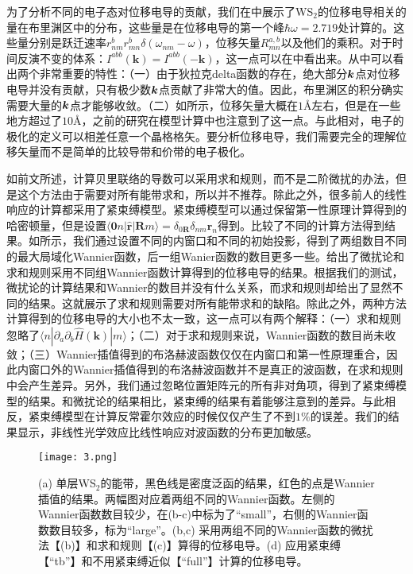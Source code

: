 为了分析不同的电子态对位移电导的贡献，我们在中展示了WS$_2$的位移电导相关的量在布里渊区中的分布，这些量是在位移电导的第一个峰$\hbar\omega = 2.719$处计算的。这些量分别是跃迁速率$r_{nm}^{b}r_{mn}^{b}\delta(\omega_{nm}-\omega)$，位移矢量$R_{mn}^{a,b}$以及他们的乘积。对于时间反演不变的体系：$I^{abb}(\mathbf{k})=I^{abb}(-\mathbf{k})$，这一点可以在中看出来。从中可以看出两个非常重要的特性：（一）由于狄拉克delta函数的存在，绝大部分$\boldsymbol{k}$点对位移电导并没有贡献，只有极少数$\boldsymbol{k}$点贡献了非常大的值。因此，布里渊区的积分确实需要大量的$\boldsymbol{k}$点才能够收敛。（二）如所示，位移矢量大概在$1$\AA 左右，但是在一些地方超过了$10$\AA ，之前的研究\cite{fregoso_quantitative_2016}在模型计算中也注意到了这一点。与此相对，电子的极化的定义可以相差任意一个晶格格矢。要分析位移电导，我们需要完全的理解位移矢量而不是简单的比较导带和价带的电子极化\cite{young2012}。


如前文所述，计算贝里联络的导数可以采用求和规则，而不是二阶微扰的办法，但是这个方法由于需要对所有能带求和，所以并不推荐。除此之外，很多前人的线性响应的计算都采用了紧束缚模型。紧束缚模型可以通过保留第一性原理计算得到的哈密顿量，但是设置$\langle\mathbf{0}n|\hat{\mathbf{r}}|\mathbf{R}m\rangle=\delta_{0\mathbf{R}}\delta_{nm}\mathbf{r}_{n}$得到。比较了不同的计算方法得到结果。如所示，我们通过设置不同的内窗口和不同的初始投影，得到了两组数目不同的最大局域化Wannier函数，后一组Wanier函数的数目更多一些。给出了微扰论和求和规则采用不同组Wannier函数计算得到的位移电导的结果。根据我们的测试，微扰论的计算结果和Wannier的数目并没有什么关系，而求和规则却给出了显然不同的结果。这就展示了求和规则需要对所有能带求和的缺陷。除此之外，两种方法计算得到的位移电导的大小也不太一致，这一点可以有两个解释：（一）求和规则忽略了$\langle n|\partial_{a}\partial_{b}\hat{H}(\mathbf{k})|m\rangle$；（二）对于求和规则来说，Wannier函数的数目尚未收敛；（三）Wannier插值得到的布洛赫波函数仅仅在内窗口和第一性原理重合，因此内窗口外的Wannier插值得到的布洛赫波函数并不是真正的波函数，在求和规则中会产生差异。另外，我们通过忽略位置矩阵元的所有非对角项，得到了紧束缚模型的结果。和微扰论的结果相比，紧束缚的结果有着能够注意到的差异。与此相反，紧束缚模型在计算反常霍尔效应的时候仅仅产生了不到$1\%$的误差\cite{wang_textitab_2006}。我们的结果显示，非线性光学效应比线性响应对波函数的分布更加敏感。

\begin{figure}
	\begin{centering}
	\texttt{[image: 3.png]}
	\par\end{centering}
	\caption{\label{fig3} (a) 单层WS$_2$的能带，黑色线是密度泛函的结果，红色的点是Wannier插值的结果。两幅图对应着两组不同的Wannier函数。左侧的Wannier函数数目较少，在(b-c)中标为了“small”，右侧的Wannier函数数目较多，标为“large”。(b,c) 采用两组不同的Wannier函数的微扰法【(b)】和求和规则【(c)】算得的位移电导。(d) 应用紧束缚【“tb”】和不用紧束缚近似【“full”】计算的位移电导。} 
	
\end{figure}


